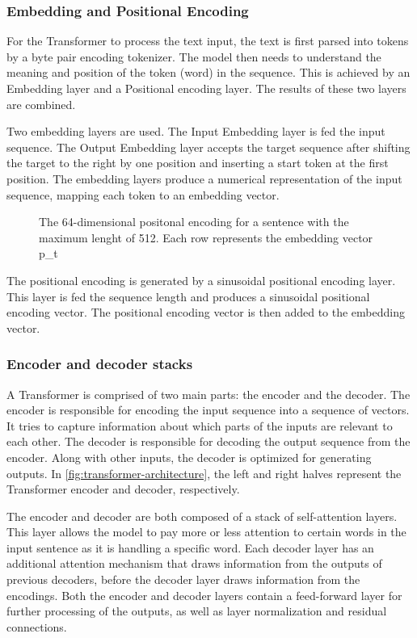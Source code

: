 \subsubsection{Embedding and Positional Encoding}
\label{sec:embedding-and-positional-encoding}
For the Transformer to process the text input, the text is first parsed into tokens by a byte pair encoding tokenizer. The model then needs to understand the meaning and position of the token (word) in the sequence. This is achieved by an Embedding layer and a Positional encoding layer. The results of these two layers are combined.

Two embedding layers are used. The Input Embedding layer is fed the input sequence. The Output Embedding layer accepts the target sequence after shifting the target to the right by one position and inserting a start token at the first position. The embedding layers produce a numerical representation of the input sequence, mapping each token to an embedding vector.

\begin{figure}[htp]
    \centering
    
    \caption{The 64-dimensional positonal encoding for a sentence with the maximum lenght of 512. Each row represents the embedding vector p\_t}
\end{figure}

The positional encoding is generated by a sinusoidal positional encoding layer. This layer is fed the sequence length and produces a sinusoidal positional encoding vector. The positional encoding vector is then added to the embedding vector.

\subsubsection{Encoder and decoder stacks}
\label{sec:encoder-decoder-stacks}
A Transformer is comprised of two main parts: the encoder and the decoder. The encoder is responsible for encoding the input sequence into a sequence of vectors. It tries to capture information about which parts of the inputs are relevant to each other. The decoder is responsible for decoding the output sequence from the encoder. Along with other inputs, the decoder is optimized for generating outputs. In \cref{fig:transformer-architecture}, the left and right halves represent the Transformer encoder and decoder, respectively. 

The encoder and decoder are both composed of a stack of self-attention layers. This layer allows the model to pay more or less attention to certain words in the input sentence as it is handling a specific word. Each decoder layer has an additional attention mechanism that draws information from the outputs of previous decoders, before the decoder layer draws information from the encodings. Both the encoder and decoder layers contain a feed-forward layer for further processing of the outputs, as well as layer normalization and residual connections.

